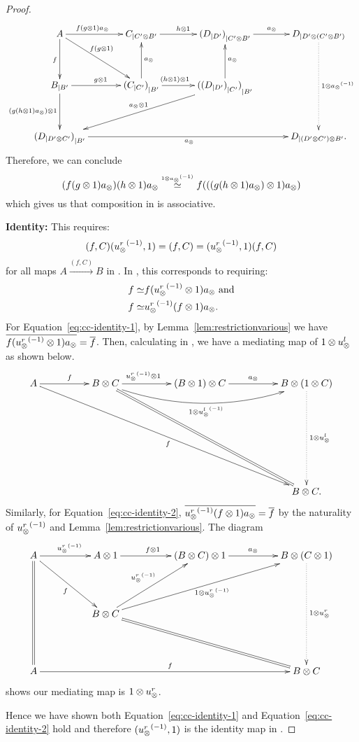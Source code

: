 \begin{proof}
  \[
    \xymatrix @C=35pt @R=35pt{
      A \ar[d]_f \ar[r]^(.4){f (g\*1) a_{\*}} \ar[dr]^(.4){f(g\*1)} &
        \xtdmn{C}{C' \* B'} \ar[r]^{h\*1}
        & \xtdmn{(\xtdmn{D}{D'})}{C' \* B'} \ar[r]^{a_{\*}}
        & \xtdmn{D}{D' \* (C' \* B')}
        \ar@{.>}[dd]^{1\*\inv{a_{\*}}}\\
      \xtdmn{B}{B'} \ar[d]_{(g (h\*1) a_{\*})\*1} \ar[r]^{g\*1}
        &\xtdmn{(\xtdmn{C}{C'})}{B'} \ar[u]_{a_{\*}} \ar[r]^(.4){(h\*1)\*1}
        & \xtdmn{(\xtdmn{(\xtdmn{D}{D'})}{C'})}{B'}
        \ar[u]_{a_\*} \ar[dll]_{a_{\*}\*1}
      \\
      \xtdmn{(\xtdmn{D}{D' \* C'})}{B'}  \ar[rrr]_{a_{\*}}
        &&& \xtdmn{D}{(D' \* C') \* B'}. %
    }
  \]
  Therefore, we can conclude
  \[
    (f(g\otimes1)a_{\otimes}) (h\otimes1)a_{\otimes} \overset{\scriptscriptstyle 1\otimes{a_{\otimes}}^{(-1)}}{\simeq} f (((g(h\otimes1)a_{\otimes})\otimes1) a_{\otimes})
  \]
  which gives us that composition in \Xt is associative.

  \textbf{Identity:} This requires:
  \[
    (f,C) ({u_{\otimes}^r}^{(-1)}, 1) = (f,C) = ({u_{\otimes}^r}^{(-1)}, 1) (f,C)
  \]
  for all maps $A\xrightarrow{(f,C)}B$ in \Xt. In \X, this corresponds to requiring:
  \begin{align}
     f \overset{\scriptscriptstyle }{\simeq} & f({u_{\otimes}^r}^{(-1)}\otimes1) a_{\otimes}\text{ and}\label{eq:cc-identity-1}\\
     f \overset{\scriptscriptstyle }{\simeq} &{u_{\otimes}^r}^{(-1)} (f \otimes1)  a_{\otimes}.\label{eq:cc-identity-2}
  \end{align}
  For Equation~\ref{eq:cc-identity-1}, by Lemma~\ref{lem:restrictionvarious} we have
  $\overline{f ({u_{\otimes}^r}^{(-1)}\otimes1) a_{\otimes}} = \overline{f}$. Then, calculating in \X, we have a mediating map
  of $1 \otimes u_{\otimes}^l$ as shown below.
  \[
    \xymatrix @C=50pt @R=45pt{
      A \ar[r]^f \ar[ddrrr]_f&
        B \* C \ar[r]^(.4){\inv{\usr}\*1}
        \ar@/_20pt/[rr]_{1 \* \inv{\usl}}
        \ar@{=}[ddrr]
        & (B \* 1) \* C \ar[r]^{a_{\*}}
        & B \* (1 \* C) \ar@{.>}[dd]^{1 \* \usl} \\
      \\
      &&& B \* C.
    }
  \]
  Similarly, for Equation~\ref{eq:cc-identity-2}, $\overline{{u_{\otimes}^r}^{(-1)} (f \otimes1)  a_{\otimes}} = \overline{f}$
  by the naturality of ${u_{\otimes}^r}^{(-1)}$ and Lemma~\ref{lem:restrictionvarious}. The diagram
  \[
    \xymatrix @C=50pt @R=45pt{
      A \ar@{=}[dd] \ar[r]^{\inv{\usr}} \ar[dr]_{f}
        &      A \* 1 \ar[r]^{f \* 1}
        & (B \* C) \* 1 \ar[r]^{a_{\*}}
        & B \* (C \* 1)\ar@{.>}[dd]^{1 \* \usr} \\
      &B\*C \ar[ur]^{\inv{\usr}} \ar[urr]_{1\*\inv{\usr}} \ar@{=}[drr]\\
      A \ar[rrr]^f &&& B \* C
    }
  \]
  shows our mediating map is $1 \otimes u_{\otimes}^r$.

  Hence we have shown both Equation~\ref{eq:cc-identity-1} and Equation~\ref{eq:cc-identity-2}
  hold and therefore $({u_{\otimes}^r}^{(-1)},1)$ is the identity map in \Xt.
\end{proof}

